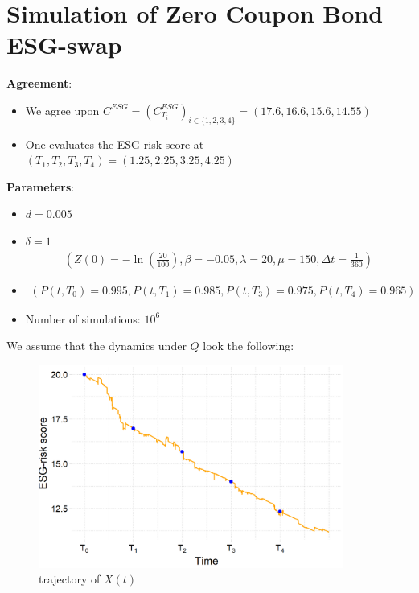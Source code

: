 \newpage 

\section{Simulation of Zero Coupon Bond ESG-swap}

\textbf{Agreement}: 
\begin{itemize}[leftmargin =*]
    \item We agree upon $C^{ESG} = (C_{T_{i}}^{ESG})_{i\in \{1,2,3,4\}} = (17.6, 16.6, 15.6, 14.55)$ 
    \item One evaluates the ESG-risk score at $(T_{1}, T_{2}, T_{3}, T_{4}) = (1.25, 2.25, 3.25, 4.25)$
\end{itemize}

\textbf{Parameters}:
\begin{itemize}
    \item $d = 0.005$
    \item $\delta = 1$
    \begin{align*}
    \left(
    Z(0) = -\ln(\frac{20}{100}), \beta = -0.05, \lambda = 20, \mu = 150, \Delta t = \frac{1}{360}
    \right)   
\end{align*} 
    \item \begin{align*}
        \left(
        P(t,T_{0}) = 0.995, P(t,T_{1}) = 0.985, P(t,T_{3}) = 0.975, P(t,T_{4}) = 0.965
        \right)
    \end{align*}
    \item Number of simulations: $10^{6}$
\end{itemize}

We assume that the dynamics under $Q$ look the following: 
\begin{figure}[htp]
    \centering
    \includegraphics[width=10cm]{figures/ESG/ESG_OU_path.png}
    \caption{trajectory of $X(t)$}
    \label{fig: ESG-risk score}
\end{figure}

